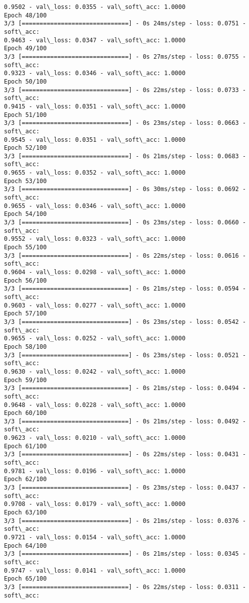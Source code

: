 \documentclass[11pt]{article}
\begin{document}
\begin{Verbatim}[commandchars=\\\{\}]
0.9502 - val\_loss: 0.0355 - val\_soft\_acc: 1.0000
Epoch 48/100
3/3 [==============================] - 0s 24ms/step - loss: 0.0751 - soft\_acc:
0.9463 - val\_loss: 0.0347 - val\_soft\_acc: 1.0000
Epoch 49/100
3/3 [==============================] - 0s 27ms/step - loss: 0.0755 - soft\_acc:
0.9323 - val\_loss: 0.0346 - val\_soft\_acc: 1.0000
Epoch 50/100
3/3 [==============================] - 0s 22ms/step - loss: 0.0733 - soft\_acc:
0.9415 - val\_loss: 0.0351 - val\_soft\_acc: 1.0000
Epoch 51/100
3/3 [==============================] - 0s 23ms/step - loss: 0.0663 - soft\_acc:
0.9545 - val\_loss: 0.0351 - val\_soft\_acc: 1.0000
Epoch 52/100
3/3 [==============================] - 0s 21ms/step - loss: 0.0683 - soft\_acc:
0.9655 - val\_loss: 0.0352 - val\_soft\_acc: 1.0000
Epoch 53/100
3/3 [==============================] - 0s 30ms/step - loss: 0.0692 - soft\_acc:
0.9655 - val\_loss: 0.0346 - val\_soft\_acc: 1.0000
Epoch 54/100
3/3 [==============================] - 0s 23ms/step - loss: 0.0660 - soft\_acc:
0.9552 - val\_loss: 0.0323 - val\_soft\_acc: 1.0000
Epoch 55/100
3/3 [==============================] - 0s 22ms/step - loss: 0.0616 - soft\_acc:
0.9604 - val\_loss: 0.0298 - val\_soft\_acc: 1.0000
Epoch 56/100
3/3 [==============================] - 0s 21ms/step - loss: 0.0594 - soft\_acc:
0.9603 - val\_loss: 0.0277 - val\_soft\_acc: 1.0000
Epoch 57/100
3/3 [==============================] - 0s 23ms/step - loss: 0.0542 - soft\_acc:
0.9655 - val\_loss: 0.0252 - val\_soft\_acc: 1.0000
Epoch 58/100
3/3 [==============================] - 0s 23ms/step - loss: 0.0521 - soft\_acc:
0.9630 - val\_loss: 0.0242 - val\_soft\_acc: 1.0000
Epoch 59/100
3/3 [==============================] - 0s 21ms/step - loss: 0.0494 - soft\_acc:
0.9648 - val\_loss: 0.0228 - val\_soft\_acc: 1.0000
Epoch 60/100
3/3 [==============================] - 0s 21ms/step - loss: 0.0492 - soft\_acc:
0.9623 - val\_loss: 0.0210 - val\_soft\_acc: 1.0000
Epoch 61/100
3/3 [==============================] - 0s 22ms/step - loss: 0.0431 - soft\_acc:
0.9781 - val\_loss: 0.0196 - val\_soft\_acc: 1.0000
Epoch 62/100
3/3 [==============================] - 0s 23ms/step - loss: 0.0437 - soft\_acc:
0.9708 - val\_loss: 0.0179 - val\_soft\_acc: 1.0000
Epoch 63/100
3/3 [==============================] - 0s 21ms/step - loss: 0.0376 - soft\_acc:
0.9721 - val\_loss: 0.0154 - val\_soft\_acc: 1.0000
Epoch 64/100
3/3 [==============================] - 0s 21ms/step - loss: 0.0345 - soft\_acc:
0.9747 - val\_loss: 0.0141 - val\_soft\_acc: 1.0000
Epoch 65/100
3/3 [==============================] - 0s 22ms/step - loss: 0.0311 - soft\_acc:

\end{Verbatim}
\end{document}
